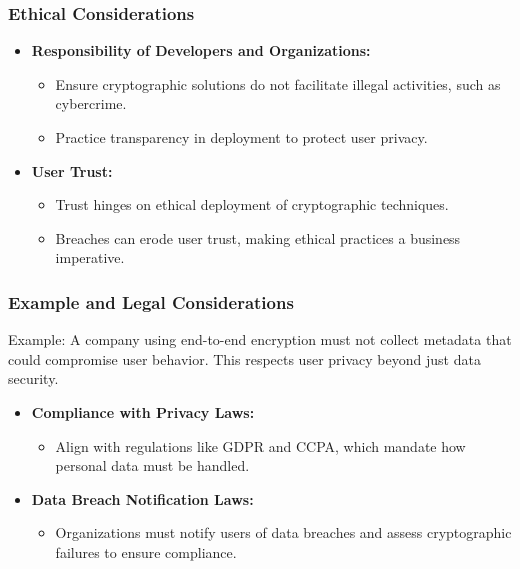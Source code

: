 \documentclass{beamer}
\begin{document}
\begin{frame}[fragile]
    \frametitle{Ethical Considerations}
    \begin{itemize}
        \item \textbf{Responsibility of Developers and Organizations:}
        \begin{itemize}
            \item Ensure cryptographic solutions do not facilitate illegal activities, such as cybercrime.
            \item Practice transparency in deployment to protect user privacy.
        \end{itemize}
        
        \item \textbf{User Trust:}
        \begin{itemize}
            \item Trust hinges on ethical deployment of cryptographic techniques.
            \item Breaches can erode user trust, making ethical practices a business imperative.
        \end{itemize}
    \end{itemize}
\end{frame}

\begin{frame}[fragile]
    \frametitle{Example and Legal Considerations}
    \begin{block}{Example:}
        A company using end-to-end encryption must not collect metadata that could compromise user behavior. This respects user privacy beyond just data security.
    \end{block}

    \begin{itemize}
        \item \textbf{Compliance with Privacy Laws:}
        \begin{itemize}
            \item Align with regulations like GDPR and CCPA, which mandate how personal data must be handled.
        \end{itemize}

        \item \textbf{Data Breach Notification Laws:}
        \begin{itemize}
            \item Organizations must notify users of data breaches and assess cryptographic failures to ensure compliance.
        \end{itemize}
    \end{itemize}
\end{frame}
\end{document}
